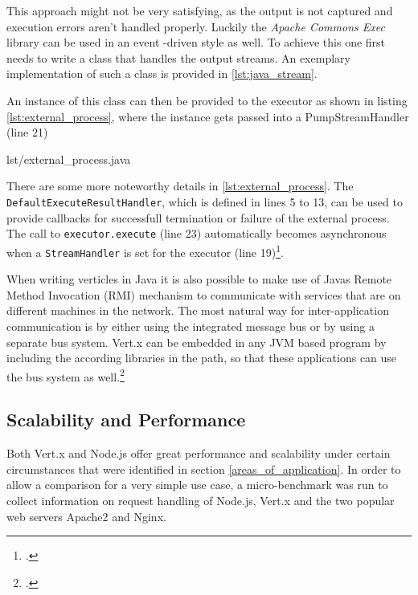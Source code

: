 This approach might not be very satisfying, as the output is not captured and
execution errors aren't handled properly. Luckily the \textit{Apache Commons Exec} library
can be used in an event -driven style as well. To achieve this one first needs to
write a class that handles the output streams.
An exemplary implementation of such a class is provided in 
\autoref{lst:java_stream}.



An instance of this class can then be provided to the executor as shown in
listing \ref{lst:external_process}, where the instance gets passed into a PumpStreamHandler (line 21)

%
{lst/external_process.java}

There are some more noteworthy details in \autoref{lst:external_process}.
The \texttt{DefaultExecuteResultHandler}, which is defined in lines 5 to
13, can be used to provide callbacks for successfull termination or failure of
the external process. The call to \texttt{executor.execute} (line 23) automatically becomes
asynchronous when a \texttt{StreamHandler} is set for the executor (line 19)\footcite[Cf.][]{apache_2010}.



When writing verticles in Java it is also possible to make use of Javas Remote
Method Invocation (RMI) mechanism to communicate with services that are on different
machines in the network.
The most natural way for inter-application communication is by either using the
integrated message bus or by using a separate bus system.
Vert.x can be embedded in any JVM based program by including the according
libraries in the path, so that these applications can use the bus system as
well.\footcite[Cf.][]{vertx_2012}



\subsection{Scalability and Performance}
\label{scalability}



Both Vert.x and Node.js offer great performance and scalability under certain
circumstances that were identified in section \ref{areas_of_application}.
In order to allow a comparison for a very simple use case, a micro-benchmark was
run to collect information on request handling of Node.js, Vert.x and the two
popular web servers Apache2 and Nginx.
